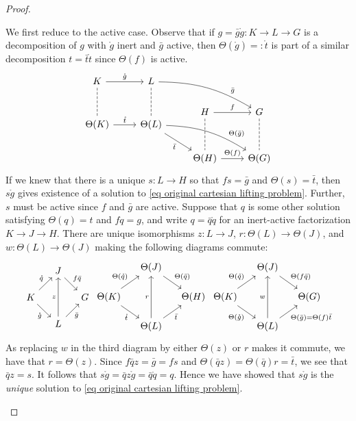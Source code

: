 \documentclass{amsart}
\numberwithin{theorem}{subsection}
\theoremstyle{definition}
\begin{document}
\begin{proof}
\begin{enumerate}
We first reduce to the active case.
Observe that if $g = \bar{g} \mathring{g} \colon K \to L \to G$ is a decomposition of $g$ with $\mathring{g}$ inert and $\bar{g}$ active, then $\Theta(\mathring{g}) =: \mathring{t}$ is part of a similar decomposition $t = \bar{t} \mathring{t}$ since $\Theta(f)$ is active.
\[ \begin{tikzcd}
K \arrow[dd, no head, dashed] \rar{\mathring{g}} & L \arrow[drr, bend left=15, "\bar{g}" near end] \arrow[dd, no head, dashed] \\
& & H \arrow[dd, no head, dashed] \rar["f"]& G \arrow[dd, no head, dashed] \\[-2em]
\Theta(K) \rar{\mathring{t}} & \Theta(L) \arrow[drr, bend left=15, "\Theta(\bar{g})" near end]
\arrow[dr, "\bar{t}" swap]
\\
& & \Theta(H) \rar["\Theta(f)"]& \Theta(G)
\end{tikzcd} \]
If we knew that there is a unique $s \colon L \to H$ so that $f s = \bar{g}$ and $\Theta(s) = \bar{t}$, then $s \mathring{g}$ gives existence of a solution to \eqref{eq original cartesian lifting problem}.
Further, $s$ must be active since $f$ and $\bar{g}$ are active.
Suppose that $q$ is some other solution satisfying $\Theta(q) = t$ and $f q = g$, and write $q = \bar{q} \mathring{q}$ for an inert-active factorization $K \to J \to H$.
There are unique isomorphisms $z \colon L \to J$, $r \colon \Theta(L) \to \Theta(J)$, and $w \colon  \Theta(L) \to \Theta(J)$ making the following diagrams commute:
\[ 
\begin{tikzcd}[column sep=small, row sep=scriptsize]
& J \arrow[dr, "f\bar{q}"] \\
K \arrow[ur,"\mathring q"] \arrow[dr, "\mathring g" swap] & & G \\
& L \arrow[uu, "z"] \arrow[ur, "\bar{g}" swap] 
\end{tikzcd} 
\begin{tikzcd}[column sep=small, row sep=scriptsize]
& \Theta(J) \arrow[dr, "\Theta(\bar{q})"] \\
\Theta(K) \arrow[ur,"\Theta(\mathring q)"] \arrow[dr, "\mathring t" swap] & & \Theta(H) \\
& \Theta(L) \arrow[uu, "r"] \arrow[ur, "\bar{t}" swap] 
\end{tikzcd} 
\begin{tikzcd}[column sep=small, row sep=scriptsize]
& \Theta(J) \arrow[dr, "\Theta(f\bar{q})"] \\
\Theta(K) \arrow[ur,"\Theta(\mathring q)"] \arrow[dr, "\Theta(\mathring g)" swap] & & \Theta(G) \\
& \Theta(L) \arrow[uu, "w"] \arrow[ur, "\Theta(\bar{g}) = \Theta(f) \bar{t}" swap] 
\end{tikzcd} 
\]
As replacing $w$ in the third diagram by either $\Theta(z)$ or $r$ makes it commute, we have that $r = \Theta(z)$.
Since $f \bar{q} z = \bar{g} = f s$ and $\Theta(\bar{q} z) = \Theta(\bar{q}) r = \bar{t}$, we see that $\bar{q} z = s$.
It follows that $s \mathring g = \bar{q} z \mathring{g} = \bar{q} \mathring{q} = q$.
Hence we have showed that $s \mathring{g}$ is the \emph{unique} solution to \eqref{eq original cartesian lifting problem}.


\end{enumerate}
\end{proof}
\end{document}
